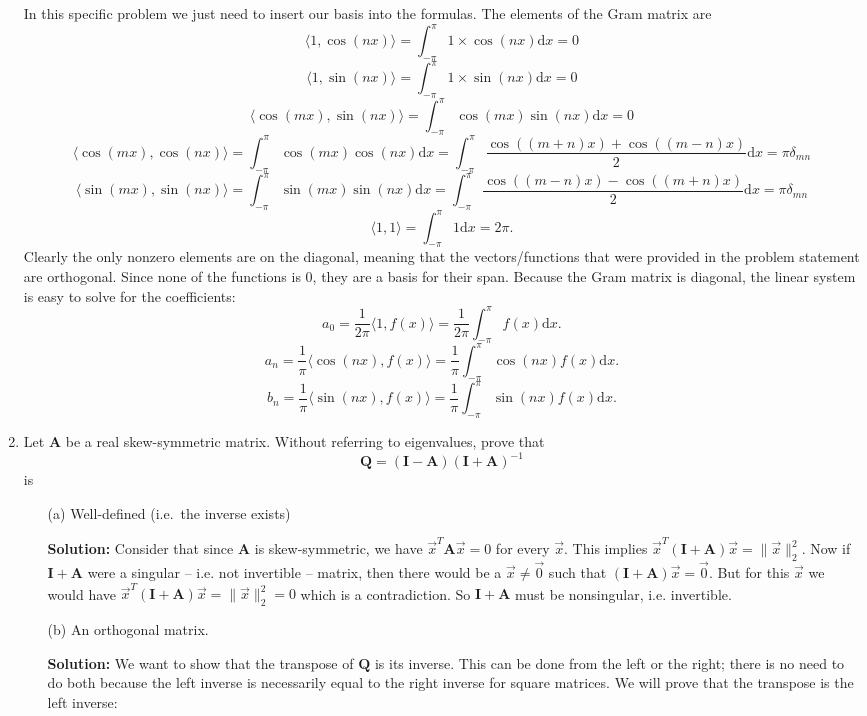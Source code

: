 \documentclass[11pt,fleqn]{article}
\begin{document}
\begin{enumerate}
In this specific problem we just need to insert our basis into the formulas.
The elements of the Gram matrix are
\[\langle 1,\cos(nx)\rangle = \int_{-\pi}^\pi 1\times \cos(n x)\mathrm{d}x = 0\]
\[\langle 1,\sin(nx)\rangle = \int_{-\pi}^\pi 1\times \sin(n x)\mathrm{d}x = 0\]
\[\langle\cos(m x),\sin(nx)\rangle = \int_{-\pi}^\pi \cos(mx)\sin(n x)\mathrm{d}x = 0\]
\[\langle \cos(mx),\cos(nx)\rangle = \int_{-\pi}^\pi \cos(mx)\cos(n x)\mathrm{d}x = \int_{-\pi}^\pi \frac{\cos((m+n)x)+\cos((m-n)x)}{2}\mathrm{d}x = \pi\delta_{mn}\]
\[\langle \sin(mx),\sin(nx)\rangle = \int_{-\pi}^\pi \sin(mx)\sin(n x)\mathrm{d}x = \int_{-\pi}^\pi \frac{\cos((m-n)x)-\cos((m+n)x)}{2}\mathrm{d}x = \pi\delta_{mn}\]
\[\langle 1,1\rangle = \int_{-\pi}^\pi 1\mathrm{d}x = 2\pi.\]
Clearly the only nonzero elements are on the diagonal, meaning that the vectors/functions that were provided in the problem statement are orthogonal.
Since none of the functions is 0, they are a basis for their span.
Because the Gram matrix is diagonal, the linear system is easy to solve for the coefficients:
\[a_0 = \frac{1}{2\pi}\langle 1,f(x)\rangle = \frac{1}{2\pi}\int_{-\pi}^\pi f(x)\mathrm{d}x.\]
\[a_n = \frac{1}{\pi}\langle\cos(nx),f(x)\rangle = \frac{1}{\pi}\int_{-\pi}^\pi\cos(nx) f(x)\mathrm{d}x.\]
\[b_n = \frac{1}{\pi}\langle\sin(nx),f(x)\rangle = \frac{1}{\pi}\int_{-\pi}^\pi\sin(nx) f(x)\mathrm{d}x.\]


\item Let $\mathbf{A}$ be a real skew-symmetric matrix. Without referring to eigenvalues, prove that
\[\mathbf{Q} = (\mathbf{I}-\mathbf{A})(\mathbf{I}+\mathbf{A})^{-1}\]
is
	\begin{itemize}
	\item[(a)] Well-defined (i.e.\ the inverse exists)
	
	{\bf Solution:} Consider that since $\mathbf{A}$ is skew-symmetric, we have $\vec{x}^T\mathbf{A}\vec{x} = 0$ for every $\vec{x}$. This implies $\vec{x}^T(\mathbf{I}+\mathbf{A})\vec{x} = \|\vec{x}\|_2^2$. Now if $\mathbf{I} + \mathbf{A}$ were a singular -- i.e. not invertible -- matrix, then there would be a $\vec{x}\neq\vec{0}$ such that $(\mathbf{I} + \mathbf{A})\vec{x} = \vec{0}$. But for this $\vec{x}$ we would have $\vec{x}^T(\mathbf{I}+\mathbf{A})\vec{x} = \|\vec{x}\|_2^2=0$ which is a contradiction. So $\mathbf{I} + \mathbf{A}$ must be nonsingular, i.e. invertible.
	\item[(b)] An orthogonal matrix.
	
	{\bf Solution:} We want to show that the transpose of $\mathbf{Q}$ is its inverse. This can be done from the left or the right; there is no need to do both because the left inverse is necessarily equal to the right inverse for square matrices. We will prove that the transpose is the left inverse:
	

\end{itemize}
\end{enumerate}
\end{document}
